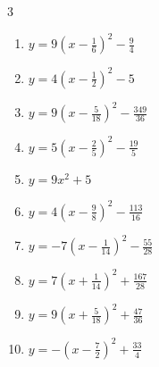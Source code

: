 \begin{multicols}{3}
\begin{enumerate}
        \phantom{$\displaystyle 頂点\left( -4 , 19 \right)$}

  \item $\displaystyle y=9\left( x-\frac{1}{6}\right)^{2}-\frac{9}{4}$


\columnbreak %

  \item $\displaystyle y=4\left( x-\frac{1}{2}\right)^{2}-5$


  \item $\displaystyle y=9\left( x-\frac{5}{18}\right)^{2}-\frac{349}{36}$


  \item $\displaystyle y=5\left( x-\frac{2}{5}\right)^{2}-\frac{19}{5}$


  \item $\displaystyle y=9x^{2}+5$

        \phantom{$\displaystyle 頂点\left( 0 , 5 \right)$}

  \item $\displaystyle y=4\left( x-\frac{9}{8}\right)^{2}-\frac{113}{16}$


  \item $\displaystyle y=-7\left( x-\frac{1}{14}\right)^{2}-\frac{55}{28}$


  \item $\displaystyle y=7\left( x+\frac{1}{14}\right)^{2}+\frac{167}{28}$


  \item $\displaystyle y=9\left( x+\frac{5}{18}\right)^{2}+\frac{47}{36}$


  \item $\displaystyle y=-\left( x-\frac{7}{2}\right)^{2}+\frac{33}{4}$


\end{enumerate}
\end{multicols}
